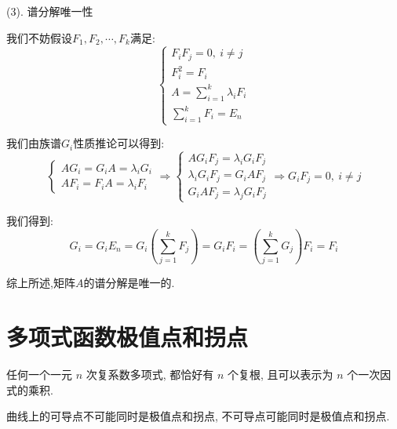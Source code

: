 \begin{anymark}[证明]
	(3). 谱分解唯一性
	
	我们不妨假设$F_{1},F_{2},\cdots,F_{k}$满足:  
	$$\left\lbrace
	\begin{array}{l}
		F_{i}F_{j}=0,\ i\neq j\\
		F_{i}^2=F_{i}\\
		A=\sum\limits_{i=1}^{k}\lambda_{i}F_{i}\\
		\sum\limits_{i=1}^{k}F_{i}=E_{n}
	\end{array}
	\right. $$
	
	我们由族谱$G_{i}$性质推论可以得到:  
	$$\left\lbrace
	\begin{array}{l}
		AG_{i}=G_{i}A=\lambda_{i}G_{i}\\
		AF_{i}=F_{i}A=\lambda_{i}F_{i}
	\end{array}
	\right. \Rightarrow \left\lbrace
	\begin{array}{l}
		AG_{i}F_{j}=\lambda_{i}G_{i}F_{j}\\
		\lambda_{i}G_{i}F_{j}=G_{i}AF_{j}\\
		G_{i}AF_{j}=\lambda_{j}G_{i}F_{j}
	\end{array}
	\right. \Rightarrow G_{i}F_{j}=0,\ i\neq j$$
	
	我们得到:  $$G_{i}=G_{i}E_{n}=G_{i}(\sum\limits_{j=1}^{k}F_{j})=G_{i}F_{i}=(\sum\limits_{j=1}^{k}G_{j})F_{i}=F_{i}$$
	
	综上所述,矩阵$A$的谱分解是唯一的.
\end{anymark}


\section{多项式函数极值点和拐点}


\begin{theorem}[代数基本定理]\label{the: 代数基本定理}
	任何一个一元 $n$ 次复系数多项式, 都恰好有 $n$ 个复根, 且可以表示为 $n$ 个一次因式的乘积.
\end{theorem}

\begin{corollary}[曲线的极值点和拐点]
	曲线上的可导点不可能同时是极值点和拐点, 不可导点可能同时是极值点和拐点.
\end{corollary}

